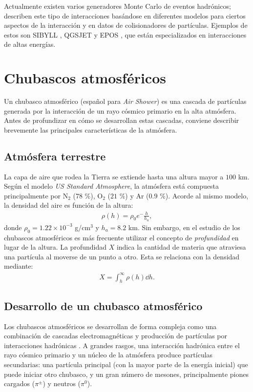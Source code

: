 	Actualmente existen varios generadores Monte Carlo de eventos hadrónicos; describen este tipo de interacciones basándose en diferentes modelos para ciertos aspectos de la interacción y en datos de colisionadores de partículas. Ejemplos de estos son SIBYLL \cite{Sibyll}, QGSJET \cite{qgsjet} y EPOS \cite{EPOS}, que están especializados en interacciones de altas energías. 
	

\section{Chubascos atmosféricos}
	Un chubasco atmosférico (español para \textit{Air Shower}) es una cascada de partículas generada por la interacción de un rayo cósmico primario en la alta atmósfera. Antes de profundizar en cómo se desarrollan estas cascadas, conviene describir brevemente las principales características de la atmósfera.
	
	\subsection{Atmósfera terrestre}
	La capa de aire que rodea la Tierra se extiende hasta una altura  mayor a $100$ km. Según el modelo \textit{US Standard Atmosphere}, la atmósfera está compuesta principalmente por N$_2$ ($78$ \%), O$_2$ ($21$ \%) y Ar ($0.9$ \%). Acorde al mismo modelo, la densidad del aire es función de la altura:
	\begin{align}
	\rho(h)=\rho_0 e^-\frac{h}{h_a},
	\end{align}
	donde $\rho_0 = 1.22\times 10^{-3}$ g/cm$^3$ y $h_a = 8.2$ km. Sin embargo, en el estudio de los chubascos atmosféricos es más frecuente utilizar el concepto de \textit{profundidad} en lugar de la altura. La profundidad $X$ indica la cantidad de materia que atraviesa una partícula al moverse de un punto a otro. Esta se relaciona con la densidad mediante:
	\begin{align}
	X = \int_h^{\infty} \rho (h) \dd h.
	\end{align}

	\subsection{Desarrollo de un chubasco atmosférico}	
	Los chubascos atmosféricos se desarrollan de forma compleja como una combinación de cascadas electromagnéticas y producción de partículas por interacciones hadrónicas \cite{Matthews2005}. A grandes rasgos, una interacción hadrónica entre el rayo cósmico primario y un núcleo de la atmósfera produce partículas secundarias: una partícula principal (con la mayor parte de la energía inicial) que puede iniciar otro chubasco, y un gran número de mesones, principalmente piones cargados ($\pi^{\pm}$) y neutros ($\pi^0$).\\

